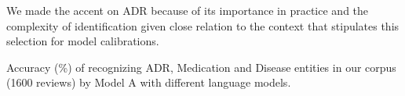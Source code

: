 \documentclass[a4paper,fleqn,longmktitle]{cas-dc}
\begin{document}
We made the accent on ADR because of its importance in practice and the complexity of identification given close relation to the context that stipulates this selection for model calibrations.

\begin{table*}
\caption{Accuracy (\%) of recognizing ADR, Medication and Disease entities in our corpus (1600 reviews) by Model A with different language models.}
\label{tab:embedding}
\centering

\end{table*}
\end{document}
